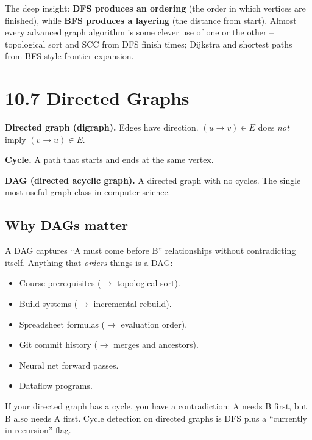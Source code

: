 \documentclass[11pt]{article}
\begin{document}
\begin{ideabox}
The deep insight: \textbf{DFS produces an ordering} (the order in which vertices are finished), while \textbf{BFS produces a layering} (the distance from start). Almost every advanced graph algorithm is some clever use of one or the other -- topological sort and SCC from DFS finish times; Dijkstra and shortest paths from BFS-style frontier expansion.
\end{ideabox}

\section{10.7 Directed Graphs}

\begin{defnbox}
\textbf{Directed graph (digraph).} Edges have direction. $(u \to v) \in E$ does \emph{not} imply $(v \to u) \in E$.

\textbf{Cycle.} A path that starts and ends at the same vertex.

\textbf{DAG (directed acyclic graph).} A directed graph with no cycles. The single most useful graph class in computer science.
\end{defnbox}

\subsection*{Why DAGs matter}

A DAG captures ``A must come before B'' relationships without contradicting itself. Anything that \emph{orders} things is a DAG:

\begin{itemize}[leftmargin=*]
    \item Course prerequisites ($\to$ topological sort).
    \item Build systems ($\to$ incremental rebuild).
    \item Spreadsheet formulas ($\to$ evaluation order).
    \item Git commit history ($\to$ merges and ancestors).
    \item Neural net forward passes.
    \item Dataflow programs.
\end{itemize}

If your directed graph has a cycle, you have a contradiction: A needs B first, but B also needs A first. Cycle detection on directed graphs is DFS plus a ``currently in recursion'' flag.
\end{document}
